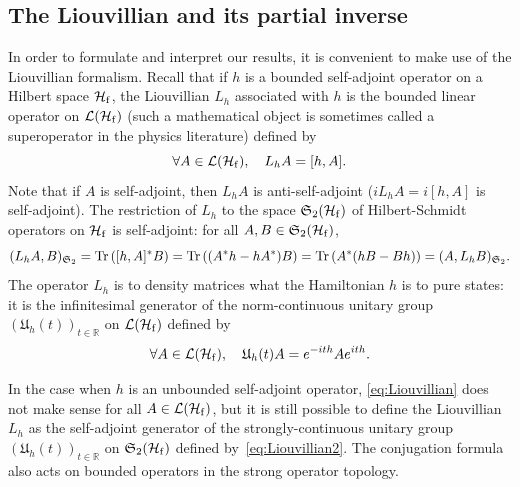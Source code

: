\documentclass[a4paper,11pt]{article}
\newcommand{\Schatten}{{\mathfrak S}}
\theoremstyle{plain}
\theoremstyle{remark}
\def\R{{\mathbb R}}
\def\cH{{\mathcal H}}
\begin{document}
\subsection{The Liouvillian and its partial inverse}
\label{sec:louvillian_intro}
In order to formulate and interpret our results, it is convenient to make use of the Liouvillian formalism. Recall that if $h$ is a bounded self-adjoint operator on a Hilbert
space ${\mathcal H}_{\rm f}$, the Liouvillian $L_h$ associated with
$h$ is the bounded linear operator on
${\mathcal L}({\mathcal H}_{\rm f})$ (such a mathematical object is
sometimes called a superoperator in the physics literature) defined by
\begin{equation}\label{eq:Liouvillian}
\forall A \in {\mathcal L}(\cH_{\rm f}), \quad L_h A = [h,A].
\end{equation}
Note that if $A$ is self-adjoint, then $L_{h} A$ is anti-self-adjoint
($iL_hA=i[h,A]$ is self-adjoint). The restriction of $L_h$ to the
space $\Schatten_2(\cH_{\rm f})$ of Hilbert-Schmidt operators on $\cH_{\rm f}$ is self-adjoint: for all $A,B \in \Schatten_2(\cH_{\rm f})$,
\begin{equation}\label{eq:LhAB}
(L_hA,B)_{\Schatten_2} = \Tr\left( [h,A]^\ast  B\right)  = \Tr\left(  (A^\ast h-hA^\ast) B\right) =  \Tr\left( A^\ast (hB-Bh) \right) = (A,L_hB)_{\Schatten_2}.
\end{equation}
The operator $L_h$ is to density matrices what the Hamiltonian $h$ is
to pure states: it is the infinitesimal generator of the
norm-continuous unitary group $({\mathfrak U}_h(t))_{t \in \R}$ on
$\mathcal L(\mathcal H_{\rm f})$ defined by
\begin{equation}\label{eq:Liouvillian2}
\forall A \in \mathcal L(\cH_{\rm f}), \quad {\mathfrak U}_h(t) A = e^{-ith}Ae^{ith}.
\end{equation}

In the  case when $h$ is an unbounded self-adjoint operator,
\eqref{eq:Liouvillian} does not make sense for all $A \in {\mathcal
  L}(\cH_{\rm f})$, but it is still possible to define the Liouvillian
$L_h$ as the self-adjoint generator of the strongly-continuous
unitary group $({\mathfrak U}_h(t))_{t\in\R}$ on
$\Schatten_2(\mathcal H_{\rm f})$ defined by~\eqref{eq:Liouvillian2}.
The conjugation formula also acts on bounded operators in the strong
operator topology.

\medskip
\end{document}
